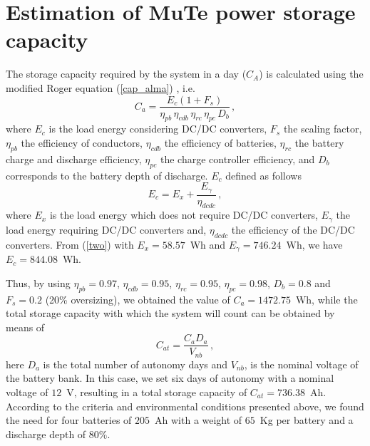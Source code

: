 \documentclass[letterpaper,11pt]{article}
\begin{document}



\appendix
\section{Estimation of MuTe power storage capacity}
\label{ApA}

The storage capacity required by the system in a day ($C_A$) is calculated using the modified Roger equation (\ref{cap_alma}) \cite{messenger2017photovoltaic}, i.e. 
\begin{equation}
C_a=\frac{E_c(1+F_s)}{\eta_{pb}\, \eta_{cdb} \, \eta_{rc} \, \eta_{pc}\, D_{b}} \, , \label{cap_alma}
\end{equation}
where $E_c$ is the load energy considering DC/DC converters, $F_s$ the scaling factor, $\eta_{pb}$ the efficiency of conductors, $\eta_{cdb}$ the efficiency of batteries, $\eta_{rc}$ the battery charge and discharge efficiency, $\eta_{pc}$ the charge controller efficiency, and $D_{b}$ corresponds to the battery depth of discharge. $E_c$ defined as follows
\begin{equation}
E_c=E_x+\frac{E_{\gamma}}{\eta_{dcdc}} \, ,
\label{two}
\end{equation}
where $E_{x}$ is the load energy which does not require DC/DC converters, $E_{\gamma}$ the load energy requiring DC/DC converters and, $\eta_{dcdc}$ the efficiency of the DC/DC converters. From (\ref{two}) with $E_{x}=58.57$~Wh and $E_{\gamma}=746.24$~Wh, we have $E_c=844.08$~Wh. 

Thus, by using $\eta_{pb}=0.97$, $\eta_{cdb}=0.95$, $\eta_{rc}=0.95$, $\eta_{pc}=0.98$, $D_{b}=0.8$ and $F_s=0.2$ (20\% oversizing), we obtained the value of $C_a=1472.75$~Wh, while the total storage capacity with which the system will count can be obtained by means of
\begin{equation}
C_{at}=\frac{C_aD_a}{V_{nb}} \, ,
\end{equation}
here $D_a$ is the total number of autonomy days and $V_{nb}$, is the nominal voltage of the battery bank. In this case, we set six days of autonomy with a nominal voltage of $12$~V, resulting in a total storage capacity of $C_{at}=736.38$~Ah. According to the criteria and environmental conditions presented above, we found the need for four batteries of $205$~Ah with a weight of $65$~Kg per battery and a discharge depth of $80\%$.
\end{document}
